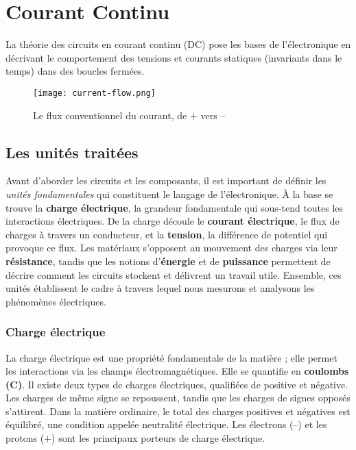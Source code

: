 \chapter{Courant Continu} \label{subsec:dc_circuit_theory}
La théorie des circuits en courant continu (DC) pose les bases de l’électronique en
décrivant le comportement des tensions et courants statiques (invariants dans le temps)
dans des boucles fermées.\\

\begin{figure}[!h]
  \centering
  \texttt{[image: current-flow.png]}
  \caption{Le flux conventionnel du courant, de \(+\) vers --}
\end{figure}

\section{Les unités traitées} \label{subsec:units}
Avant d’aborder les circuits et les composants, il est important de définir
les \textit{unités fondamentales} qui constituent le langage de l’électronique.
À la base se trouve la \textbf{charge électrique}, la grandeur fondamentale
qui sous-tend toutes les interactions électriques. De la charge découle le \textbf{courant
électrique}, le flux de charges à travers un conducteur, et la \textbf{tension},
la différence de potentiel qui provoque ce flux. Les matériaux s’opposent au
mouvement des charges via leur \textbf{résistance}, tandis que les notions
d’\textbf{énergie} et de \textbf{puissance} permettent de décrire comment les circuits
stockent et délivrent un travail utile. Ensemble, ces unités établissent le
cadre à travers lequel nous mesurons et analysons les phénomènes électriques.\par
\vspace{\baselineskip}
\subsection{Charge électrique}\label{subsec:electric_charge}
La charge électrique est une propriété fondamentale de la matière ; elle permet
les interactions via les champs électromagnétiques. Elle se quantifie en \textbf{coulombs
(\unit{\coulomb})}. Il existe deux types de charges électriques, qualifiées de
positive et négative. Les charges de même signe se repoussent, tandis que les charges
de signes opposés s’attirent. Dans la matière ordinaire, le total des charges
positives et négatives est équilibré, une condition appelée neutralité électrique.
Les électrons (--) et les protons (\(+\)) sont les principaux porteurs de charge électrique.

